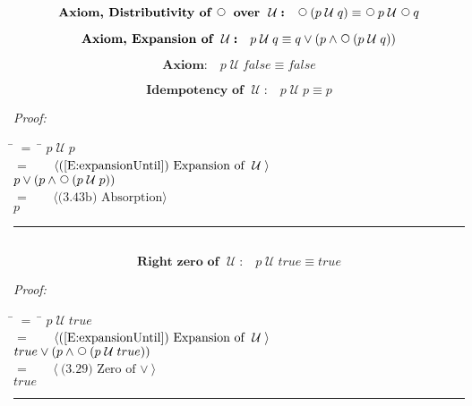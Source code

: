 \documentclass[fleqn, leqno]{article}
\newcommand{\lgap}{2pt}                             %
\newcommand{\mymathindent}{24pt}                    %
\newcommand{\Until}{\;\mathcal{U}\;}
\newcommand{\Next}{\;\,\text{\raisebox{3.5pt}{\circle{6}}}}
\newcommand{\myqed}{\hfill\rule[-.23ex]{1.2ex}{2.0ex}}
\newcommand{\Gll} {\langle}                         %
\newcommand{\Ggg} {\rangle}                         %
\newcommand{\Hint}[1]     {\ \ \ $\Gll              \mbox{#1} \Ggg$ }   %
\begin{document}
\begin{equation}\label{E:distNextUntil}
\textbf{Axiom, Distributivity of $\Next$ over $\Until$:}\quad \Next (p \Until q) \equiv \Next p \Until \Next q
\end{equation}

\begin{equation}\label{E:expansionUntil}
\textbf{Axiom, Expansion of $\Until$:}\quad p \Until q \equiv q \lor (p \land \Next (p \Until q))
\end{equation}


\begin{equation}\label{E:untilFalse}
\textbf{Axiom:}\quad p \Until false \equiv false
\end{equation}


\begin{equation}\label{E:idemUntil}
\textbf{Idempotency of $\Until$:}\quad p \Until p \equiv p
\end{equation}

\emph{Proof:}
\begin{tabbing}
\hspace{\mymathindent} \= $= \;$ \= \kill
  \> \>   $p \Until p$\\[\lgap]
  \> $=$  \>  \Hint{(\ref{E:expansionUntil}) Expansion of $\Until$}\\[\lgap]
  \> \>   $p \lor (p \land \Next(p \Until p))$\\[\lgap]
  \> $=$  \>  \Hint{(3.43b) Absorption}\\[\lgap]
  \> \>   $p$\\[\lgap]
\end{tabbing}
\myqed\\[\lgap]

\begin{equation}\label{E:zeroUntil}
\textbf{Right zero of $\Until$:}\quad p \Until true \equiv true
\end{equation}

\emph{Proof:}
\begin{tabbing}
\hspace{\mymathindent} \= $= \;$ \= \kill
  \> \>   $p \Until true$\\[\lgap]
  \> $=$  \>  \Hint{(\ref{E:expansionUntil}) Expansion of $\Until$}\\[\lgap]
  \> \>   $true \lor (p \land \Next(p \Until true))$\\[\lgap]
  \> $=$  \>  \Hint{(3.29) Zero of $\lor$}\\[\lgap]
  \> \>   $true$\\[\lgap]
\end{tabbing}
\myqed\\[\lgap]
\end{document}
